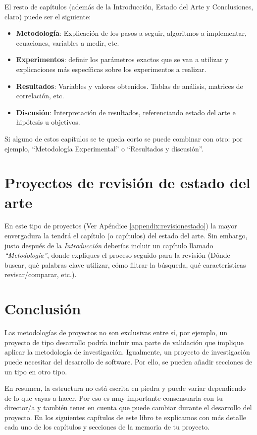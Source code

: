 El resto de capítulos (además de la Introducción, Estado del Arte y Conclusiones, claro) puede ser el siguiente:
\begin{itemize}
    \item \textbf{Metodología}: Explicación de los pasos a seguir, algoritmos a implementar, ecuaciones, variables a medir, etc.
    \item \textbf{Experimentos}: definir los parámetros exactos que se van a utilizar y explicaciones más específicas sobre los experimentos a realizar.
    \item \textbf{Resultados}: Variables y valores obtenidos. Tablas de análisis, matrices de correlación, etc.
    \item \textbf{Discusión}: Interpretación de resultados, referenciando estado del arte e hipótesis u objetivos.
\end{itemize}
    
Si alguno de estos capítulos se te queda corto se puede combinar con otro: por ejemplo, ``Metodología Experimental'' o ``Resultados y discusión''.
        
\section{Proyectos de revisión de estado del arte} 

En este tipo de proyectos (Ver Apéndice  \ref{appendix:revisionestado}) la mayor envergadura la tendrá el capítulo (o capítulos) del estado del arte. Sin embargo, justo después de la \textit{Introducción} deberías incluir un capítulo llamado \textit{``Metodología''}, donde expliques el proceso seguido para la revisión (Dónde buscar, qué palabras clave utilizar, cómo filtrar la búsqueda, qué características revisar/comparar, etc.).


\section{Conclusión}


 Las metodologías de proyectos no son exclusivas entre sí, por ejemplo, un proyecto de tipo desarrollo podría incluir una parte de validación que implique aplicar la metodología de investigación. Igualmente, un proyecto de investigación puede necesitar del desarrollo de software. Por ello, se pueden añadir secciones de un tipo en otro tipo.

En resumen, la estructura no está escrita en piedra y puede variar dependiendo de lo que vayas a hacer. Por eso es muy importante consensuarla con tu director/a y también tener en cuenta que puede cambiar durante el desarrollo del proyecto. En los siguientes capítulos de este libro te explicamos con más detalle cada uno de los capítulos y secciones de la memoria de tu proyecto.

